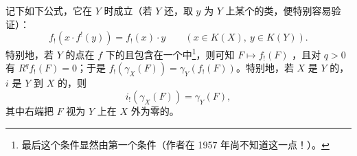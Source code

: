 记下如下公式，它在 $Y$ 时成立（若 $Y$ 还，取 $y$ 为 $Y$ 上某个的类，便特别容易验证）：
\[
f_!(x\cdot f^!(y))=f_!(x)\cdot y\qquad(x\in K(X),\ y\in K(Y)).\tag{2.27}
\]
特别地，若 $Y$ 的点在 $f$ 下的且包含在一个中\footnote{最后这个条件显然由第一个条件（作者在 1957 年尚不知道这一点！）。}，则可知 $F\mapsto f_!(F)$ ，且对 $q>0$ 有 $R^qf_!(F)=0$；于是 $f_!(\gamma_X(F))=\gamma_Y(f_!(F))$。特别地，若 $X$ 是 $Y$ 的，$i$ 是 $Y$ 到 $X$ 的，则
\[
i_!(\gamma_X(F))=\gamma_Y(F),\tag{2.28}
\]
其中右端把 $F$ 视为 $Y$ 上在 $X$ 外为零的。

